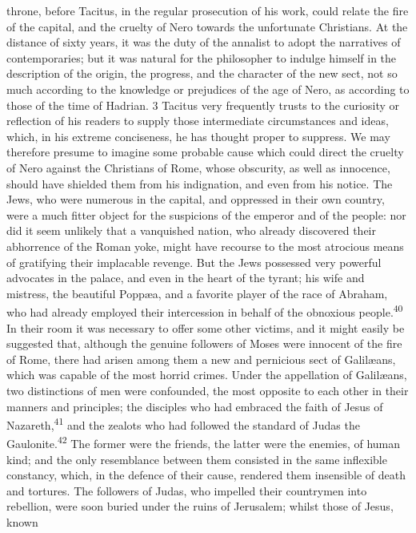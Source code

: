 throne, before Tacitus, in the regular prosecution of his work,
could relate the fire of the capital, and the cruelty of Nero
towards the unfortunate Christians. At the distance of sixty
years, it was the duty of the annalist to adopt the narratives of
contemporaries; but it was natural for the philosopher to indulge
himself in the description of the origin, the progress, and the
character of the new sect, not so much according to the knowledge
or prejudices of the age of Nero, as according to those of the
time of Hadrian. 3 Tacitus very frequently trusts to the
curiosity or reflection of his readers to supply those
intermediate circumstances and ideas, which, in his extreme
conciseness, he has thought proper to suppress. We may therefore
presume to imagine some probable cause which could direct the
cruelty of Nero against the Christians of Rome, whose obscurity,
as well as innocence, should have shielded them from his
indignation, and even from his notice. The Jews, who were
numerous in the capital, and oppressed in their own country, were
a much fitter object for the suspicions of the emperor and of the
people: nor did it seem unlikely that a vanquished nation, who
already discovered their abhorrence of the Roman yoke, might have
recourse to the most atrocious means of gratifying their
implacable revenge. But the Jews possessed very powerful
advocates in the palace, and even in the heart of the tyrant; his
wife and mistress, the beautiful Poppæa, and a favorite player of
the race of Abraham, who had already employed their intercession
in behalf of the obnoxious people.\textsuperscript{40} In their room it was
necessary to offer some other victims, and it might easily be
suggested that, although the genuine followers of Moses were
innocent of the fire of Rome, there had arisen among them a new
and pernicious sect of Galilæans, which was capable of the most
horrid crimes. Under the appellation of Galilæans, two
distinctions of men were confounded, the most opposite to each
other in their manners and principles; the disciples who had
embraced the faith of Jesus of Nazareth,\textsuperscript{41} and the zealots who
had followed the standard of Judas the Gaulonite.\textsuperscript{42} The former
were the friends, the latter were the enemies, of human kind; and
the only resemblance between them consisted in the same
inflexible constancy, which, in the defence of their cause,
rendered them insensible of death and tortures. The followers of
Judas, who impelled their countrymen into rebellion, were soon
buried under the ruins of Jerusalem; whilst those of Jesus, known
